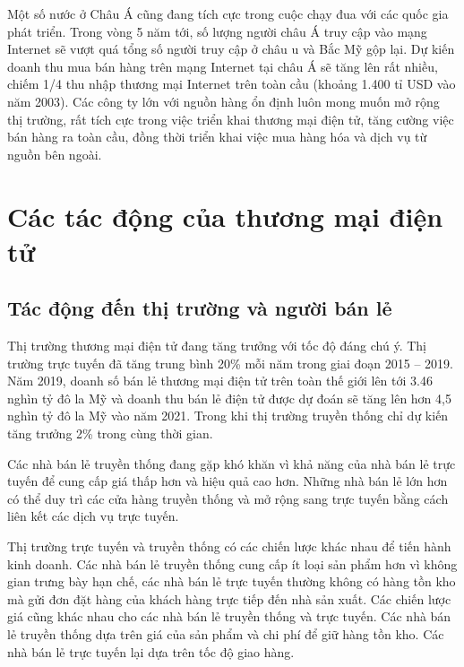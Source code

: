 \documentclass[12pt]{article}
\begin{document}
Một số nước ở Châu Á cũng đang tích cực trong cuộc chạy đua với các quốc gia phát triển. Trong vòng 5 năm tới, số lượng người châu Á truy cập vào mạng Internet sẽ v­ượt quá tổng số ng­ười truy cập ở châu  u và Bắc Mỹ gộp lại. Dự kiến doanh thu mua bán hàng trên mạng Internet tại châu Á sẽ tăng lên rất nhiều, chiếm 1/4 thu nhập thương mại Internet trên toàn cầu (khoảng 1.400 tỉ USD vào năm 2003). Các công ty lớn với nguồn hàng ổn định luôn mong muốn mở rộng thị tr­ường, rất tích cực trong việc triển khai th­ương mại điện tử, tăng cư­ờng việc bán hàng ra toàn cầu, đồng thời triển khai việc mua hàng hóa và dịch vụ từ nguồn bên ngoài.

\section{Các tác động của thương mại điện tử}
\subsection{Tác động đến thị trường và người bán lẻ}
Thị trường thương mại điện tử đang tăng trưởng với tốc độ đáng chú ý. Thị trường trực tuyến đã tăng trung bình 20\% mỗi năm trong giai đoạn 2015 – 2019. Năm 2019, doanh số bán lẻ thương mại điện tử trên toàn thế giới lên tới 3.46 nghìn tỷ đô la Mỹ và doanh thu bán lẻ điện tử được dự đoán sẽ tăng lên hơn 4,5 nghìn tỷ đô la Mỹ vào năm 2021. Trong khi thị trường truyền thống chỉ dự kiến tăng trưởng 2\% trong cùng thời gian.

Các nhà bán lẻ truyền thống đang gặp khó khăn vì khả năng của nhà bán lẻ trực tuyến để cung cấp giá thấp hơn và hiệu quả cao hơn. Những nhà bán lẻ lớn hơn có thể duy trì các cửa hàng truyền thống và mở rộng sang trực tuyến bằng cách liên kết các dịch vụ trực tuyến. 

Thị trường trực tuyến và truyền thống có các chiến lược khác nhau để tiến hành kinh doanh. Các nhà bán lẻ truyền thống cung cấp ít loại sản phẩm hơn vì không gian trưng bày hạn chế, các nhà bán lẻ trực tuyến thường không có hàng tồn kho mà gửi đơn đặt hàng của khách hàng trực tiếp đến nhà sản xuất. Các chiến lược giá cũng khác nhau cho các nhà bán lẻ truyền thống và trực tuyến. Các nhà bán lẻ truyền thống dựa trên giá của sản phẩm và chi phí để giữ hàng tồn kho. Các nhà bán lẻ trực tuyến lại dựa trên tốc độ giao hàng.
\end{document}
